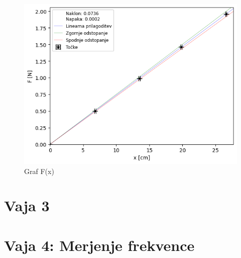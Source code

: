\documentclass{report}
\begin{document}
\begin{figure}[H]
  \caption{Graf F(x)}
  \includegraphics[width=\textwidth]{F(x)}
\end{figure}

\chapter{Vaja 3}


\chapter{Vaja 4: Merjenje frekvence}
\end{document}
